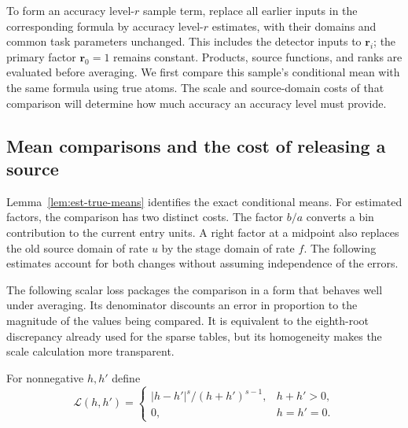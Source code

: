 \documentclass[11pt]{article}
\numberwithin{equation}{section}
\theoremstyle{definition}
\theoremstyle{remark}
\begin{document}
To form an accuracy level-${r}$ sample term, replace all earlier inputs in the
corresponding formula by accuracy level-${r}$ estimates, with their domains and
common task parameters unchanged.  This includes the detector inputs
to ${\mathbf{r}}_i$; the primary factor ${\mathbf{r}}_0=1$ remains constant.  Products, source
functions, and ranks are evaluated before averaging.  We first compare
this sample's conditional mean with the same formula using true atoms.
The scale and source-domain costs of that comparison will determine
how much accuracy an accuracy level must provide.

\subsection{Mean comparisons and the cost of releasing a source}

Lemma~\ref{lem:est-true-means} identifies the exact conditional means.
For estimated factors, the comparison has two distinct costs.  The
factor $b/a$ converts a bin contribution to the current entry units.
A right factor at a midpoint also replaces the old source domain of
rate $u$ by the stage domain of rate $f$.  The following estimates
account for both changes without assuming independence of the errors.

The following scalar loss packages the comparison in a form that behaves well under averaging. Its denominator discounts an error in proportion to the magnitude of the values being compared. It is equivalent to the eighth-root discrepancy already used for the sparse tables, but its homogeneity makes the scale calculation more transparent.

For nonnegative ${h},{h}'$ define
\begin{equation}
 \mathcal L({h},{h}')=
 \begin{cases}|{h}-{h}'|^s/({h}+{h}')^{s-1},&{h}+{h}'>0,\\0,&{h}={h}'=0.
 \end{cases}
 \label{eq:est-loss}
\end{equation}
\end{document}

